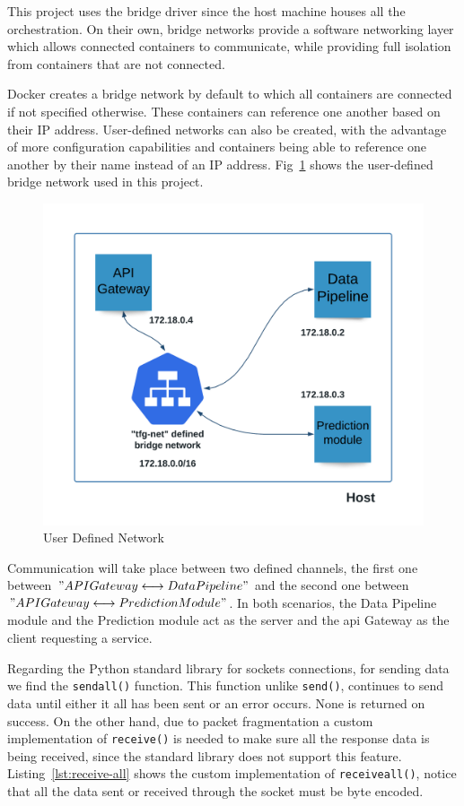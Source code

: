 This project uses the bridge driver since the host machine houses all the orchestration. On their own, bridge networks provide a software networking layer which allows connected containers to communicate, while providing full isolation from containers that are not connected.

Docker creates a bridge network by default to which all containers are connected if not specified otherwise. These containers can reference one another based on their IP address. User-defined networks can also be created, with the advantage of more configuration capabilities and containers being able to reference one another by their name instead of an IP address. Fig~\ref{fig:tfg-net} shows the user-defined bridge network used in this project.

\begin{figure}[h]
    \centering
    \includegraphics[width=\textwidth]{figures/tfg-net.png}
     \caption{User Defined Network}
    \label{fig:tfg-net}
\end{figure}

Communication will take place between two defined channels, the first one between $"API Gateway \longleftrightarrow Data Pipeline"$ and the second one between $"API Gateway \longleftrightarrow Prediction Module"$. In both scenarios, the Data Pipeline module and the Prediction module act as the server and the \gls{api} Gateway as the client requesting a service. 

Regarding the Python standard library for sockets connections, for sending data we find the \lstinline[language=python]{sendall()} function. This function unlike \lstinline[language=python]{send()}, continues to send data until either it all has been sent or an error occurs. None is returned on success. On the other hand, due to packet fragmentation a custom implementation of \lstinline[language=python]{receive()} is needed to make sure all the response data is being received, since the standard library does not support this feature. Listing~\ref{lst:receive-all} shows the custom implementation of \lstinline[language=python]{receiveall()}, notice that all the data sent or received through the socket must be byte encoded.\\

